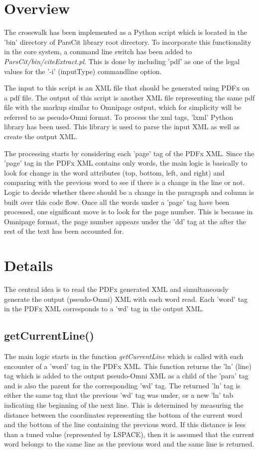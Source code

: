 \section{Overview}
The crosswalk has been implemented as a Python script which is located in the 'bin' directory of ParsCit library root directory.
To incorporate this functionality in the core system, a command line switch has been added to \emph{ParsCit/bin/citeExtract.pl}.
This is done by including 'pdf' as one of the legal values for the '-i' (inputType) commandline option.

The input to this script is an XML file that should be generated using PDFx on a pdf file.
The output of this script is another XML file representing the same pdf file with the markup similar to Omnipage output, which for simplicity will be referred to as pseudo-Omni format.
To process the xml tags, 'lxml' Python library has been used.
This library is used to parse the input XML as well as create the output XML.

The processing starts by considering each 'page' tag of the PDFx XML.
Since the 'page' tag in the PDFx XML contains only words, the main logic is basically to look for change in the word attributes (top, bottom, left, and right) and comparing with the previous word to see if there is a change in the line or not.
Logic to decide whether there should be a change in the paragraph and column is built over this code flow.
Once all the words under a 'page' tag have been processed, one significant move is to look for the page number.
This is because in Omnipage format, the page number appears under the 'dd' tag at the after the rest of the text has been accounted for.

\section{Details}
The central idea is to read the PDFx generated XML and simultaneously generate the output (pseudo-Omni) XML with each word read.
Each 'word' tag in the PDFx XML corresponds to a 'wd' tag in the output XML.

\subsection{getCurrentLine()}
The main logic starts in the function \emph{getCurrentLine} which is called with each encounter of a 'word' tag in the PDFx XML.
This function returns the 'ln' (line) tag which is added to the output pseudo-Omni XML as a child of the 'para' tag and is also the parent for the corresponding 'wd' tag.
The returned 'ln' tag is either the same tag that the previous 'wd' tag was under, or a new 'ln' tab indicating the beginning of the next line.
This is determined by measuring the distance between the coordinates representing the bottom of the current word and the bottom of the line containing the previous word.
If this distance is less than a tuned value (represented by LSPACE), then it is assumed that the current word belongs to the same line as the previous word and the same line is returned.

